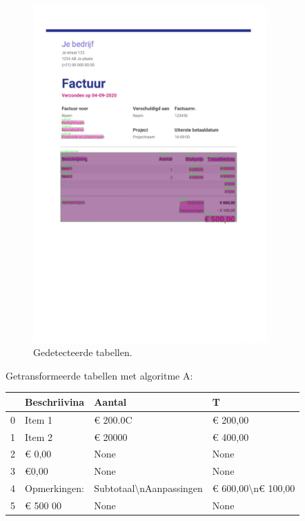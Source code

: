 \begin{figure}[H]
    \centering
    \includegraphics[width=0.8\textwidth]{test-resultaten/25/detected_tables.png}
    \caption{Gedetecteerde tabellen.}
\end{figure}

Getransformeerde tabellen met algoritme A:

\begin{tabular}{llll}
\toprule
{} &  Beschriivina &                   Aantal &                   T \\
\midrule
0 &        Item 1 &                 € 200.0C &            € 200,00 \\
1 &        Item 2 &                  € 20000 &            € 400,00 \\
2 &        € 0,00 &                     None &                None \\
3 &         €0,00 &                     None &                None \\
4 &  Opmerkingen: &  Subtotaal\textbackslash nAanpassingen &  € 600,00\textbackslash n€ 100,00 \\
5 &      € 500 00 &                     None &                None \\
\bottomrule
\end{tabular}

